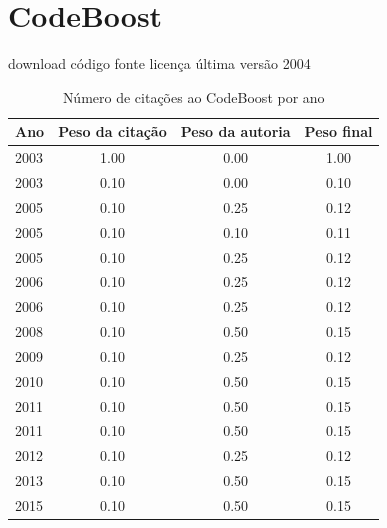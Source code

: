 \section{CodeBoost}
\checkmark download
\checkmark código fonte
\checkmark licença
\checkmark última versão 2004
\begin{table}[H]
\caption{Número de citações ao CodeBoost por ano}
\centering
\begin{tabular}{| l | c | c | c |}
  \hline
  Ano & Peso da citação & Peso da autoria & Peso final \\
  \hline
  2003
    & 1.00
    & 0.00
    & {\color{blue} 1.00} \\
  2003
    & 0.10
    & 0.00
    & {\color{red} 0.10} \\
\hline
  2005
    & 0.10
    & 0.25
    & {\color{red} 0.12} \\
  2005
    & 0.10
    & 0.10
    & {\color{red} 0.11} \\
  2005
    & 0.10
    & 0.25
    & {\color{red} 0.12} \\
\hline
  2006
    & 0.10
    & 0.25
    & {\color{red} 0.12} \\
  2006
    & 0.10
    & 0.25
    & {\color{red} 0.12} \\
\hline
  2008
    & 0.10
    & 0.50
    & {\color{red} 0.15} \\
\hline
  2009
    & 0.10
    & 0.25
    & {\color{red} 0.12} \\
\hline
  2010
    & 0.10
    & 0.50
    & {\color{red} 0.15} \\
\hline
  2011
    & 0.10
    & 0.50
    & {\color{red} 0.15} \\
  2011
    & 0.10
    & 0.50
    & {\color{red} 0.15} \\
\hline
  2012
    & 0.10
    & 0.25
    & {\color{red} 0.12} \\
\hline
  2013
    & 0.10
    & 0.50
    & {\color{red} 0.15} \\
\hline
  2015
    & 0.10
    & 0.50
    & {\color{red} 0.15} \\
\hline
\end{tabular}
\end{table}
